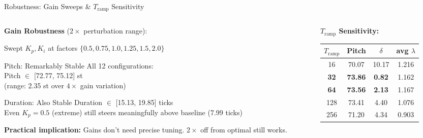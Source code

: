 \documentclass[aspectratio=169, 11pt]{beamer}
\begin{document}
\begin{frame}{Robustness: Gain Sweeps \& $T_\text{ramp}$ Sensitivity}

\begin{columns}[T]
\begin{column}{0.48\textwidth}
\textbf{Gain Robustness} ($2\times$ perturbation range):

\vspace{0.3em}
{\small Swept $K_p, K_i$ at factors $\{0.5, 0.75, 1.0, 1.25, 1.5, 2.0\}$}

\vspace{0.3em}
\begin{exampleblock}{Pitch: Remarkably Stable}
\small
All 12 configurations:\\
Pitch $\in$ [72.77, 75.12] st\\
(range: 2.35 st over $4\times$ gain variation)
\end{exampleblock}

\begin{exampleblock}{Duration: Also Stable}
\small
Duration $\in$ [15.13, 19.85] ticks\\
Even $K_p{=}0.5$ (extreme) still steers meaningfully above baseline (7.99 ticks)
\end{exampleblock}

\vspace{0.2em}
{\small\textbf{Practical implication:} Gains don't need precise tuning. $2\times$ off from optimal still works.}
\end{column}

\begin{column}{0.48\textwidth}
\textbf{$T_\text{ramp}$ Sensitivity:}

\vspace{0.3em}
\begin{table}
\centering\small
\begin{tabular}{cccc}
  \toprule
  $T_\text{ramp}$ & Pitch & $\delta$ & avg $\lambda$ \\
  \midrule
  16 & 70.07 & \color{alertred}10.17 & 1.216 \\
  \textbf{32} & \textbf{73.86} & \textbf{0.82} & 1.162 \\
  \textbf{64} & \textbf{73.56} & \textbf{2.13} & 1.167 \\
  128 & 73.41 & 4.40 & 1.076 \\
  256 & 71.20 & 4.34 & 0.903 \\
  \bottomrule
\end{tabular}
\end{table}


\end{column}
\end{columns}
\end{frame}
\end{document}
